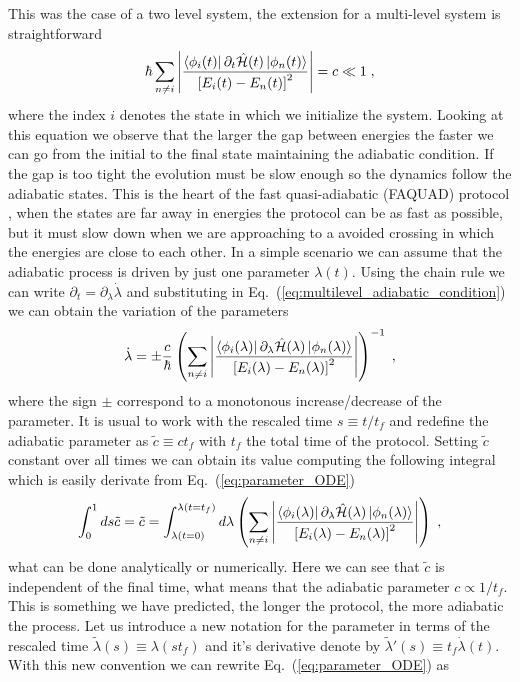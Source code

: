 This was the case of a two level system, the extension for a multi-level system is straightforward
\begin{equation}
	\hbar\sum_{n\neq i}\abs{\frac{\bra{\phi_i(t)}\partial_t \hat{\mathcal{H}}(t)\ket{\phi_n(t)}}{\left[E_i(t)-E_n(t)\right]^2}}=c\ll 1\; ,
	\label{eq:multilevel_adiabatic_condition}
\end{equation}
where the index $i$ denotes the state in which we initialize the system. Looking at this equation we observe that the larger the gap between energies the faster we can go from the initial to the final state maintaining the adiabatic condition. If the gap is too tight the evolution must be slow enough so the dynamics follow the adiabatic states. This is the heart of the fast quasi-adiabatic (FAQUAD) protocol \cite{MartinezGaraot2015}, when the states are far away in energies the protocol can be as fast as possible, but it must slow down when we are approaching to a avoided crossing in which the energies are close to each other. In a simple scenario we can assume that the adiabatic process is driven by just one parameter $\lambda(t)$. Using the chain rule we can write $\partial_t=\partial_\lambda \dot{\lambda}$ and substituting in Eq.~(\ref{eq:multilevel_adiabatic_condition}) we can obtain the variation of the parameters
\begin{equation}
	\dot{\lambda}=\pm \frac{c}{\hbar}\left(\sum_{n\neq i}\abs{\frac{\bra{\phi_i(\lambda)}\partial_\lambda \hat{\mathcal{H}}(\lambda)\ket{\phi_n(\lambda)}}{\left[E_i(\lambda)-E_n(\lambda)\right]^2}}\right)^{-1}\; ,
	\label{eq:parameter_ODE}
\end{equation}
where the sign $\pm$ correspond to a monotonous increase/decrease of the parameter. It is usual to work with the rescaled time $s\equiv t/t_f$ and redefine the adiabatic parameter as $\tilde{c}\equiv ct_f$ with $t_f$ the total time of the protocol. Setting $\tilde{c}$ constant over all times we can obtain its value computing the following integral which is easily derivate from Eq.~(\ref{eq:parameter_ODE})
\begin{equation}
	\int_0^1 ds\tilde{c}=\tilde{c}=\int_{\lambda(t=0)}^{\lambda(t=t_f)}d\lambda \left(\sum_{n\neq i}\abs{\frac{\bra{\phi_i(\lambda)}\partial_\lambda \hat{\mathcal{H}}(\lambda)\ket{\phi_n(\lambda)}}{\left[E_i(\lambda)-E_n(\lambda)\right]^2}}\right)\; ,
	\label{eq:c_tilde_deff}
\end{equation}
what can be done analytically or numerically. Here we can see that $\tilde{c}$ is independent of the final time, what means that the adiabatic parameter $c\propto 1/t_f$. This is something we have predicted, the longer the protocol, the more adiabatic the process. Let us introduce a new notation for the parameter in terms of the rescaled time $\tilde{\lambda}(s)\equiv \lambda(s t_f)$ and it's derivative denote by $\tilde{\lambda}'(s)\equiv t_f\dot{\lambda}(t)$. With this new convention we can rewrite Eq.~(\ref{eq:parameter_ODE}) as
